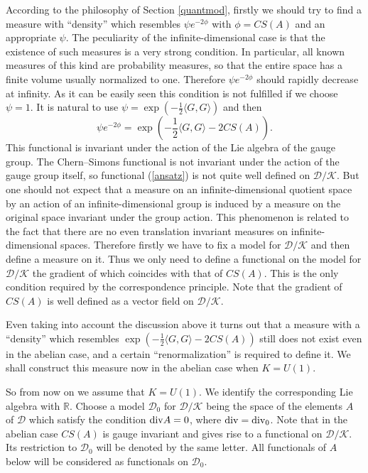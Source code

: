 \documentclass{amsart}
\begin{document}
According to the philosophy of Section \ref{quantmod}, firstly we should try to find a measure with ``density'' which resembles $\psi e^{-2\phi}$ with $\phi=CS(A)$ and an appropriate $\psi$. The peculiarity of the infinite-dimensional case is that the existence of such measures is a very strong condition. In particular, all known measures of this kind are probability measures, so that the entire space has a finite volume usually normalized to one. Therefore $\psi e^{-2\phi}$ should rapidly decrease at infinity. As it can be easily seen this condition is not fulfilled if we choose $\psi=1$. It is natural to use $\psi=\exp(-\frac12\langle G,G\rangle )$ and then 
\begin{equation}\label{ansatz}
\psi e^{-2\phi}=\exp(-\frac12\langle G,G\rangle -2CS(A)).	
\end{equation}
This functional is invariant under the action of the Lie algebra of the gauge group. The Chern--Simons functional is not invariant under the action of the gauge group itself, so functional (\ref{ansatz}) is not quite well defined on $\mathcal{D}/\mathcal{K}$. But one should not expect that a measure on an infinite-dimensional quotient space by an action of an infinite-dimensional group is induced by a measure on the original space invariant under the group action. This phenomenon is related to the fact that there are no even translation invariant measures on infinite-dimensional spaces. Therefore firstly we have to fix a model for $\mathcal{D}/\mathcal{K}$ and then define a measure on it. Thus we only need to define a functional on the model for $\mathcal{D}/\mathcal{K}$ the gradient of which coincides with that of $CS(A)$. This is the only condition required by the correspondence principle. Note that the gradient of $CS(A)$ is well defined as a vector field on $\mathcal{D}/\mathcal{K}$.  

Even taking into account the discussion above it turns out that a measure with a ``density'' which resembles $\exp(-\frac12\langle G,G\rangle -2CS(A))$ still does not exist even in the abelian case, and a certain ``renormalization'' is required to define it. We shall construct this measure now in the abelian case when $K=U(1)$.

So from now on we assume that $K=U(1)$. We identify the corresponding Lie algebra with $\mathbb{R}$. Choose a model $\mathcal{D}_0$ for $\mathcal{D}/\mathcal{K}$ being the space of the elements $A$ of $\mathcal{D}$ which satisfy the condition ${\rm div}A=0$, where ${\rm div}={\rm div}_0$. Note that in the abelian case $CS(A)$ is gauge invariant and gives rise to a functional on $\mathcal{D}/\mathcal{K}$. Its restriction to $\mathcal{D}_0$ will be denoted by the same letter. All functionals of $A$ below will be considered as functionals on $\mathcal{D}_0$.  
 
\end{document}
